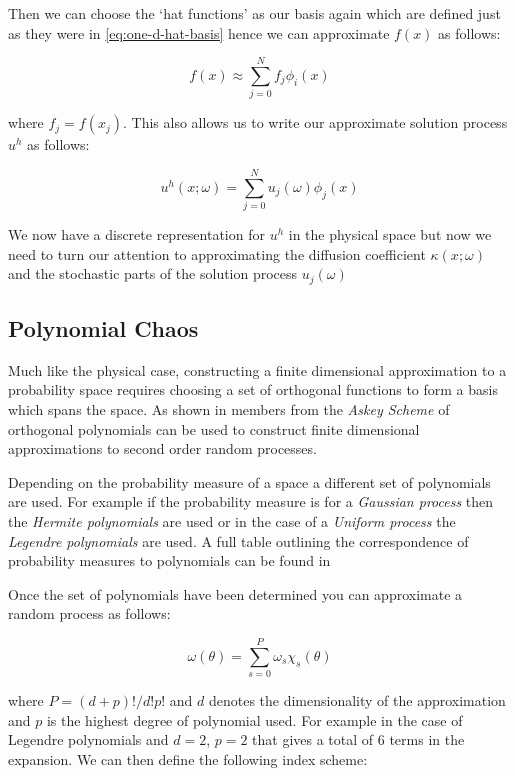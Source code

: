 Then we can choose the `hat functions' as our basis again which are defined
just as they were in \ref{eq:one-d-hat-basis} hence we can approximate $f(x)$
as follows:

\begin{equation}\label{eq:oned-stochastic-f-approx}
    f(x) \approx \sum_{j=0}^Nf_j\phi_i(x)
\end{equation}

where $f_j = f(x_j)$. This also allows us to write our approximate solution
process $u^h$ as follows:

\begin{equation}\label{eq:oned-stochastic-uh}
    u^h(x;\omega) = \sum_{j=0}^Nu_j(\omega)\phi_j(x)
\end{equation}

We now have a discrete representation for $u^h$ in the physical space but now
we need to turn our attention to approximating the diffusion coefficient
$\kappa(x;\omega)$ and the stochastic parts of the solution process
$u_j(\omega)$

\subsection{Polynomial Chaos}

Much like the physical case, constructing a finite dimensional approximation to
a probability space requires choosing a set of orthogonal functions to form a
basis which spans the space. As shown in \cite{gpc} members from the
\textit{Askey Scheme} of orthogonal polynomials can be used to construct finite
dimensional approximations to second order random processes.

Depending on the probability measure of a space a different set of polynomials
are used. For example if the probability measure is for a
\textit{Gaussian process} then the \textit{Hermite polynomials} are used or in
the case of a \textit{Uniform process} the \textit{Legendre polynomials} are
used. A full table outlining the correspondence of probability measures to
polynomials can be found in \cite{general-poly-chaos}

Once the set of polynomials have been determined you can approximate a random
process as follows:

\begin{equation}
    \omega(\theta) = \sum_{s=0}^P\omega_s\chi_s(\theta)
\end{equation}

where $P = (d + p)!/d!p!$ and $d$ denotes the dimensionality of the
approximation and $p$ is the highest degree of polynomial used. For example in
the case of Legendre polynomials and $d=2$, $p=2$ that gives a total of 6
terms in the expansion. We can then define the following index scheme:

